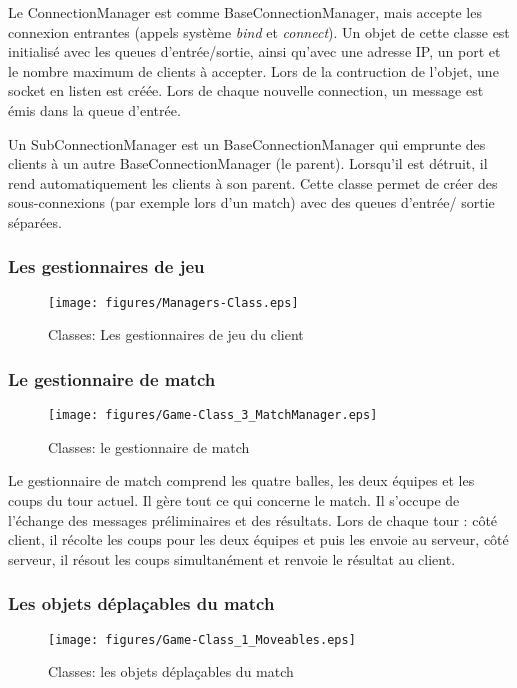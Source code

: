 Le ConnectionManager est comme BaseConnectionManager, mais accepte les connexion entrantes (appels système 
\emph{bind} et \emph{connect}). Un objet de cette classe est initialisé avec les queues d'entrée/sortie, 
ainsi qu'avec une adresse IP, un port et le nombre maximum de clients à accepter. Lors de la contruction de 
l'objet, une socket en listen est créée. Lors de chaque nouvelle connection, un message est émis dans la queue d'entrée.

Un SubConnectionManager est un BaseConnectionManager qui emprunte des clients à un autre 
BaseConnectionManager (le parent). Lorsqu'il est détruit, il rend automatiquement les clients à son parent. 
Cette classe permet de créer des sous-connexions (par exemple lors d'un match) avec des queues d'entrée/
sortie séparées.

\subsubsection{Les gestionnaires de jeu}
\begin{figure}[h!]
  \centering
  \texttt{[image: figures/Managers-Class.eps]}
  \caption{\label{fig:Class:Managers} Classes: Les gestionnaires de jeu du client}
\end{figure}


\subsubsection{Le gestionnaire de match}
\begin{figure}[h!]
  \centering
  \texttt{[image: figures/Game-Class\_3\_MatchManager.eps]}
  \caption{\label{fig:Class:MatchManager} Classes: le gestionnaire de match}
\end{figure}

Le gestionnaire de match comprend les quatre balles, les deux équipes et les coups du 
tour actuel. Il gère tout ce qui concerne le match. Il s'occupe de l'échange 
des messages préliminaires et des résultats. Lors de chaque tour : côté 
client, il récolte les coups pour les deux équipes et puis les envoie au 
\gls{serveur}, côté serveur, il résout les coups simultanément et renvoie le résultat 
au \gls{client}.

\subsubsection{Les objets déplaçables du match}
\begin{figure}[h!]
  \centering
  \texttt{[image: figures/Game-Class\_1\_Moveables.eps]}
  \caption{\label{fig:Class:GameMoveables} Classes: les objets déplaçables du match}
\end{figure}

